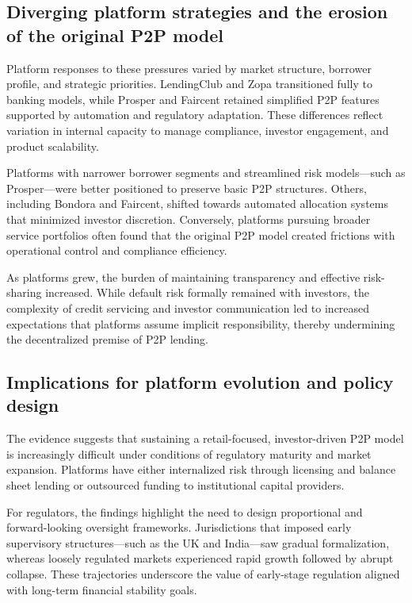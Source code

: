 \documentclass[pdflatex,sn-apa]{sn-jnl}%
\theoremstyle{thmstyleone}%
\theoremstyle{thmstyletwo}%
\theoremstyle{thmstylethree}%
\begin{document}
\subsection{Diverging platform strategies and the erosion of the original P2P model}
Platform responses to these pressures varied by market structure, borrower profile, and strategic priorities. LendingClub and Zopa transitioned fully to banking models, while Prosper and Faircent retained simplified P2P features supported by automation and regulatory adaptation. These differences reflect variation in internal capacity to manage compliance, investor engagement, and product scalability.

Platforms with narrower borrower segments and streamlined risk models—such as Prosper—were better positioned to preserve basic P2P structures. Others, including Bondora and Faircent, shifted towards automated allocation systems that minimized investor discretion. Conversely, platforms pursuing broader service portfolios often found that the original P2P model created frictions with operational control and compliance efficiency.

As platforms grew, the burden of maintaining transparency and effective risk-sharing increased. While default risk formally remained with investors, the complexity of credit servicing and investor communication led to increased expectations that platforms assume implicit responsibility, thereby undermining the decentralized premise of P2P lending.

\subsection{Implications for platform evolution and policy design}
The evidence suggests that sustaining a retail-focused, investor-driven P2P model is increasingly difficult under conditions of regulatory maturity and market expansion. Platforms have either internalized risk through licensing and balance sheet lending or outsourced funding to institutional capital providers. 

For regulators, the findings highlight the need to design proportional and forward-looking oversight frameworks. Jurisdictions that imposed early supervisory structures—such as the UK and India—saw gradual formalization, whereas loosely regulated markets experienced rapid growth followed by abrupt collapse. These trajectories underscore the value of early-stage regulation aligned with long-term financial stability goals.
\end{document}
